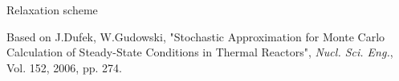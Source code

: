 \documentclass[t]{beamer}
\begin{document}
\begin{frame}{Relaxation scheme}

    {\small
    Based on J.Dufek, W.Gudowski, "Stochastic Approximation for Monte Carlo
    Calculation of Steady-State Conditions in Thermal Reactors", {\it Nucl.
    Sci. Eng.}, Vol. 152, 2006, pp. 274.
    }

    \begin{columns}
            \fbox{
}
\end{columns}
\end{frame}
\end{document}
